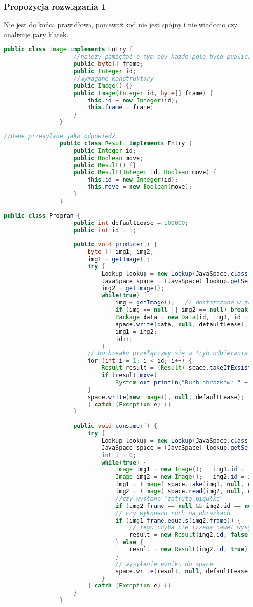 		\subsubsection{Propozycja rozwiązania 1}
			Nie jest do końca prawidłowa, ponieważ kod nie jest spójny i nie wiadomo czy analizuje pary klatek.
			\begin{lstlisting}[language=Java]
				public class Image implements Entry {
					//należy pamiętać o tym aby każde pole było publiczne!
					public byte[] frame;
					public Integer id;
					//wymagane konstruktory
					public Image() {}
					public Image(Integer id, byte[] frame) {
						this.id = new Integer(id);
						this.frame = frame;
					}
				}
			\end{lstlisting}
			\begin{lstlisting}[language=Java]
				//Dane przesyłane jako odpowiedź
				public class Result implements Entry {
					public Integer id;
					public Boolean move;
					public Result() {}
					public Result(Integer id, Boolean move) {
						this.id = new Integer(id);
						this.move = new Boolean(move);
					}
				}
			\end{lstlisting}
			\newpage
			\begin{lstlisting}[language=Java]
				public class Program {
					public int defaultLease = 100000;
					public int id = 1;
					
					public void producer() {
						byte [] img1, img2;
						img1 = getImage();
						try {
							Lookup lookup = new Lookup(JavaSpace.class);
							JavaSpace space = (JavaSpace) lookup.getService();
							img2 = getImage();
							while(true) {
								img = getImage();	// dostarczone w zadaniu
								if (img == null || img2 == null) break;	// null = koniec
								Package data = new Data(id, img1, id + 1, img2);
								space.write(data, null, defaultLease);	// paczka do space
								img1 = img2;
								id++;
							}
						// bo breaku przełączamy się w tryb odbierania
						for (int i = 1; i < id; i++) {
							Result result = (Result) space.takeIfExsists(new Result(), null, defaultLease);
							if (result.move)
								System.out.println("Ruch obrazków: " + result.id1 + " " + result.id2);
						}
						space.write(new Image(), null, defaultLease);
						} catch (Exception e) {}
					}
					
					public void consumer() {
						try {
							Lookup lookup = new Lookup(JavaSpace.class);
							JavaSpace space = (JavaSpace) lookup.getService();
							int i = 0;
							while(true) {
								Image img1 = new Image();	img1.id = i++;
								Image img2 = new Image(); 	img2.id = i;
								img1 = (Image) space.take(img1, null, defaultLese);
								img2 = (Image) space.read(img2, null, defaultLese);
								//czy wysłano "zatrutą pigułkę"
								if (img2.frame == null && img2.id == null) break;
								// czy wykonano ruch na obrazkach
								if (img1.frame.equals(img2.frame)) {
									// tego chyba nie trzeba nawet wysyłać w tym zadaniu
									result = new Result(img2.id, false);
								} else {
									result = new Result(img2.id, true);
								}
								// wysyłanie wyniku do space
								space.write(result, null, defaultLease);
							}
						} catch (Exception e) {}
					}
				}
			\end{lstlisting}
	\newpage		

